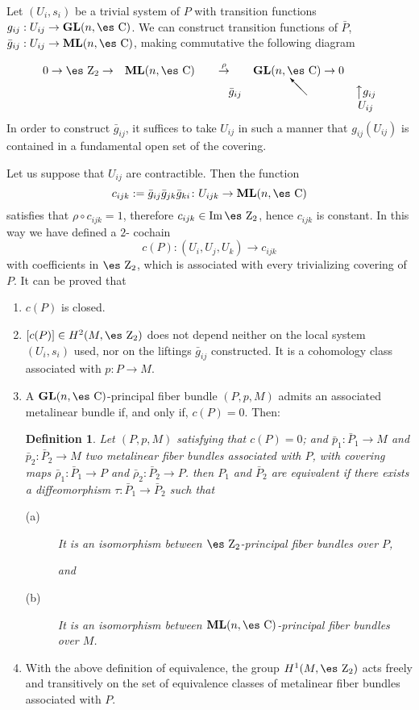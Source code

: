 \documentclass[12pt]{article}
\theoremstyle{plain}
\newtheorem{definition}{Definition}
\def\map#1{\mathrel{\mathop{\to}\limits^{#1}}}
\def\GL{{\bf GL}(n,\Complex )}
\def\ML{{\bf ML}(n,\Complex )}
\def\Zahl{\mbox{\es Z}}
\def\Complex{\mbox{\es C}}
\begin{document}
Let $(U_i,s_i)$ be a trivial system of $P$ with transition functions
$g_{ij} : U_{ij} \to \GL$. We can construct transition functions of
$\bar P$,
$\bar g_{ij} : U_{ij} \to \ML$, making commutative the following diagram

$$
\begin{array}{ccccc}
0 \to \Zahl_2 \to & \ML & \map{\rho} & \GL \to 0
\\
& & \qquad \bar g_{ij}
&
\begin{picture}(15,15)(0,0)
\put(15,0){\vector(-1,1){15}}
\end{picture}
& \big\uparrow g_{ij}
\\
& & & & U_{ij}
\end{array}
$$
In order to construct $\bar g_{ij}$, it suffices to take $U_{ij}$
in such a manner that $g_{ij}(U_{ij})$
is contained in a fundamental open set of the covering.

Let us suppose that $U_{ij}$ are contractible. Then the function
$$
c_{ijk} := \bar g_{ij} \bar g_{jk} \bar g_{ki} \colon U_{ijk} \to \ML
$$
satisfies that $\rho \circ c_{ijk} = 1$, therefore
$c_{ijk} \in {\rm Im}\, \Zahl_2$, hence $c_{ijk}$ is constant.
In this way we have defined a $2$- cochain
$$
c(P) : (U_i,U_j,U_k) \to c_{ijk}
$$
with coefficients in $\Zahl_2$,
which is associated with every trivializing covering of $P$.
It can be proved that
\begin{enumerate}
\item
$c(P)$ is closed.
\item
$[c(P)] \in H^2(M,\Zahl_2)$ does not depend neither on the local system
$(U_i,s_i)$ used, nor on the liftings $\bar g_{ij}$ constructed.
It is a cohomology class associated with $p\colon P \to M$.
\item
A $\GL$-principal fiber bundle $(P,p,M)$ admits an associated metalinear
bundle
if, and only if, $c(P)=0$. Then:

\begin{definition}
Let $(P,p,M)$ satisfying that $c(P)=0$; and
$\bar p_1:\bar P_1 \to M$ and $\bar p_2:\bar P_2 \to M$
two metalinear fiber bundles associated with $P$,
with covering maps $\bar \rho_1\colon\bar P_1 \to P$ and
$\bar \rho_2\colon\bar P_2 \to P$. then $P_1$ and $\bar P_2$ are
{\rm equivalent} if there exists a diffeomorphism
$\tau : \bar P_1 \to \bar P_2$ such that
\begin{description}
\item[{\rm (a)}]
It is an isomorphism between $\Zahl_2$-principal fiber bundles over $P$,

and
\item[{\rm (b)}]
It is an isomorphism between $\ML$-principal fiber bundles over $M$.
\end{description}
\label{amfbeq}
\end{definition}

\item
With the above definition of equivalence, the group $H^1(M,\Zahl_2)$
acts freely and transitively on the set of equivalence classes of
metalinear fiber bundles associated with $P$.
\end{enumerate}
\end{document}
